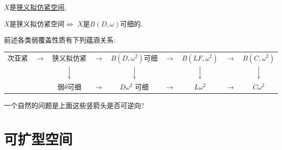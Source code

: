 \documentclass[main.tex]{subfiles}
\begin{document}
\begin{corollary}
	
\begin{definition}
	$X$是\underline{狭义拟仿紧空间},
\end{definition}

\begin{fact}
	$X$是狭义拟仿紧空间$\Leftrightarrow$ $X$是$B(D,\omega)$可细的.
\end{fact}
前述各类弱覆盖性质有下列蕴涵关系\textnormal{:}

\vspace{.3cm}
\begin{tabular}{ccccccccc}
次亚紧 & $\longrightarrow$ & 狭义拟仿紧&$\longrightarrow$&$B(D, \omega^2)$可细&
   $\longrightarrow$ & $B(LF, \omega^2)$ & $\longrightarrow$ & $B(C, \omega^2)$ \\
   & & $\Big\downarrow$ & & $\Big\downarrow$  & & $\Big\downarrow$ &&$\Big\downarrow$ \\
 & & 弱$\overline{\theta}$可细&$\longrightarrow$&$D\omega^2$ 可细&
$\longrightarrow$ & $L\omega^2$ & $\longrightarrow$ & $C\omega^2$ \\
 \end{tabular}

\end{corollary}

一个自然的问题是上面这些竖箭头是否可逆向?

\section{可扩型空间}\label{ch1.3}
	
\end{document}
